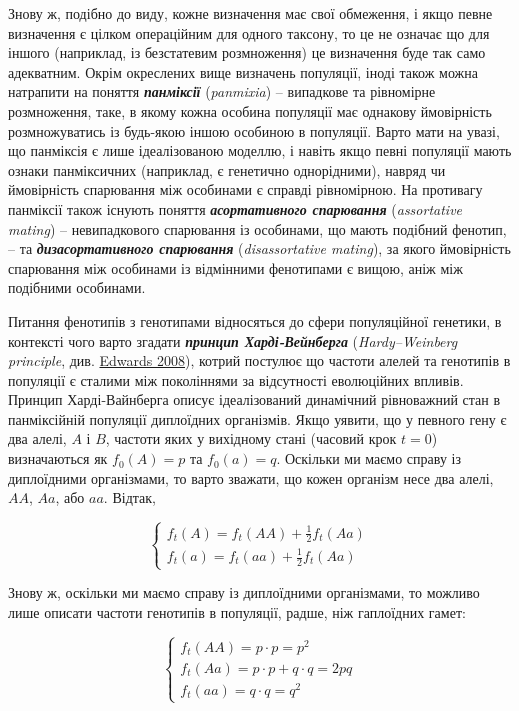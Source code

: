 \documentclass[
  11pt,
]{book}
\begin{document}
Знову ж, подібно до виду, кожне визначення має свої обмеження, і якщо певне визначення є цілком операційним для одного таксону, то це не означає що для іншого (наприклад, із безстатевим розмноження) це визначення буде так само адекватним. Окрім окреслених вище визначень популяції, іноді також можна натрапити на поняття \textbf{\emph{панміксії}} (\emph{panmixia}) -- випадкове та рівномірне розмноження, таке, в якому кожна особина популяції має однакову ймовірність розмножуватись із будь-якою іншою особиною в популяції. Варто мати на увазі, що панміксія є лише ідеалізованою моделлю, і навіть якщо певні популяції мають ознаки панміксичних (наприклад, є генетично однорідними), навряд чи ймовірність спарювання між особинами є справді рівномірною. На противагу панміксії також існують поняття \textbf{\emph{асортативного спарювання}} (\emph{assortative mating}) -- невипадкового спарювання із особинами, що мають подібний фенотип, -- та \textbf{\emph{дизасортативного спарювання}} (\emph{disassortative mating}), за якого ймовірність спарювання між особинами із відмінними фенотипами є вищою, аніж між подібними особинами.

Питання фенотипів з генотипами відносяться до сфери популяційної генетики, в контексті чого варто згадати \textbf{\emph{принцип Харді-Вейнберга}} (\emph{Hardy--Weinberg principle}, див. \href{https://doi.org/10.1534/genetics.104.92940}{Edwards 2008}), котрий постулює що частоти алелей та генотипів в популяції є сталими між поколіннями за відсутності еволюційних впливів. Принцип Харді-Вайнберга описує ідеалізований динамічний рівноважний стан в панміксійній популяції диплоїдних організмів. Якщо уявити, що у певного гену є два алелі, \(A\) і \(B\), частоти яких у вихідному стані (часовий крок \(t = 0\)) визначаються як \(f_0 (A) = p\) та \(f_0(a) = q\). Оскільки ми маємо справу із диплоїдними організмами, то варто зважати, що кожен організм несе два алелі, \(AA\), \(Aa\), або \(aa\). Відтак,

\[
\begin{cases}
f_t(A) = f_t(AA) + \frac{1}{2} f_t (Aa) \\
f_t(a) = f_t(aa) + \frac{1}{2} f_t (Aa)
\end{cases}
\]

Знову ж, оскільки ми маємо справу із диплоїдними організмами, то можливо лише описати частоти генотипів в популяції, радше, ніж гаплоїдних гамет:

\[
\begin{cases}
f_t(AA) = p \cdot p = p^2\\
f_t(Aa) = p \cdot p + q \cdot q = 2pq \\
f_t(aa) = q \cdot q = q^2
\end{cases}
\]
\end{document}
